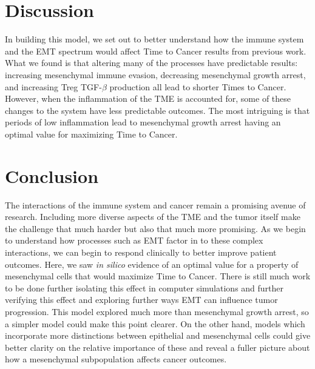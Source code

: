 \documentclass[11pt, a4paper, preprint]{article}
\begin{document}
\section{Discussion}\label{Discussion}
In building this model, we set out to better understand how the immune system and the EMT spectrum would affect Time to Cancer results from previous work.
What we found is that altering many of the processes have predictable results: increasing mesenchymal immune evasion, decreasing mesenchymal growth arrest, and increasing Treg TGF-$\beta$ production all lead to shorter Times to Cancer.
However, when the inflammation of the TME is accounted for, some of these changes to the system have less predictable outcomes.
The most intriguing is that periods of low inflammation lead to mesenchymal growth arrest having an optimal value for maximizing Time to Cancer.







\section{Conclusion}\label{Conclusion}
The interactions of the immune system and cancer remain a promising avenue of research.
Including more diverse aspects of the TME and the tumor itself make the challenge that much harder but also that much more promising.
As we begin to understand how processes such as EMT factor in to these complex interactions, we can begin to respond clinically to better improve patient outcomes.
Here, we saw {\it in silico} evidence of an optimal value for a property of mesenchymal cells that would maximize Time to Cancer.
There is still much work to be done further isolating this effect in computer simulations and further verifying this effect and exploring further ways EMT can influence tumor progression.
This model explored much more than mesenchymal growth arrest, so a simpler model could make this point clearer.
On the other hand, models which incorporate more distinctions between epithelial and mesenchymal cells could give better clarity on the relative importance of these and reveal a fuller picture about how a mesenchymal subpopulation affects cancer outcomes.
\end{document}
